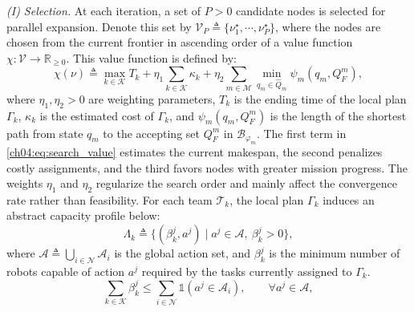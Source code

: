 \emph{(I) Selection.}
At each iteration, a set of $P>0$ candidate nodes is selected for parallel
expansion. Denote this set by
$\mathcal{V}_P \triangleq \{\nu_1^\star,\cdots,\nu_P^\star\}$, where the nodes
are chosen from the current frontier in ascending order of a value function
$\chi:\mathcal{V}\rightarrow\mathbb{R}_{\ge 0}$. This value function is defined
by:
\begin{equation}
\label{ch04:eq:search_value}
\chi(\nu) \triangleq
\max_{k\in\mathcal{K}} T_k
+ \eta_1 \sum_{k\in\mathcal{K}} \kappa_k
+ \eta_2 \sum_{m\in\mathcal{M}}
\min_{q_m\in\widehat{Q}_m}\psi_m(q_m,Q_F^m),
\end{equation}
where $\eta_1,\eta_2>0$ are weighting parameters, $T_k$ is the ending time of
the local plan $\Gamma_k$, $\kappa_k$ is the estimated cost of $\Gamma_k$, and
$\psi_m(q_m,Q_F^m)$ is the length of the shortest path from state $q_m$ to the
accepting set $Q_F^m$ in $\mathcal{B}_{\varphi_m}$. The first term in
\eqref{ch04:eq:search_value} estimates the current makespan, the second
penalizes costly assignments, and the third favors nodes with greater mission
progress. The weights $\eta_1$ and $\eta_2$ regularize the search order and
mainly affect the convergence rate rather than feasibility.
For each team $\mathcal{T}_k$, the local plan $\Gamma_k$ induces an abstract
capacity profile below:
\begin{equation}
\label{ch04:eq:capacity-team}
\Lambda_k \triangleq
\{(\beta_k^j,a^j)\mid a^j\in\mathcal{A},\ \beta_k^j>0\},
\end{equation}
where $\mathcal{A} \triangleq \bigcup_{i\in\mathcal{N}}\mathcal{A}_i$ is the
global action set, and $\beta_k^j$ is the minimum number of robots capable of
action $a^j$ required by the tasks currently assigned to $\Gamma_k$. 
\begin{equation}
\label{ch04:eq:capacity-bound}
\sum_{k\in\mathcal{K}} \beta_k^j
\leq
\sum_{i\in\mathcal{N}} \mathds{1}(a^j\in\mathcal{A}_i),
\qquad \forall a^j\in\mathcal{A},
\end{equation}

